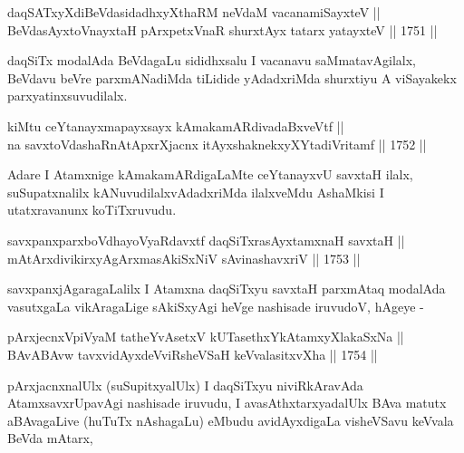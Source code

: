 \begin{shl}
daqSATxyXdiBeVdasidadhxyXthaRM neVdaM vacanamiSayxteV ||  \\
BeVdasAyxtoV\s nayxtaH pArxpetxVnaR shurxtAyx tatarx yatayxteV ||  1751 ||  
\end{shl}

\begin{artha}
daqSiTx modalAda BeVdagaLu sididhxsalu I vacanavu saMmatavAgilalx,
BeVdavu beVre parxmANadiMda tiLidide yAdadxriMda shurxtiyu A
viSayakekx parxyatinxsuvudilalx.
\end{artha}

\begin{shl}
kiMtu ceYtanayxmapayxsayx kAmakamARdivadaBxveVtf || \\
na savxtoV\s dashaRnAtApxrXjacnx itAyxshaknekxyXYtadiVritamf ||  1752 ||  
\end{shl}

\begin{artha}
Adare I Atamxnige kAmakamARdigaLaMte ceYtanayxvU savxtaH ilalx,
suSupatxnalilx kANuvudilalxvAdadxriMda ilalxveMdu AshaMkisi I
utatxravanunx koTiTxruvudu.
\end{artha}


\begin{shl}
savxpanxparxboVdhayoVyaRdavxtf daqSiTxrasAyx\s \s tamxnaH savxtaH || \\
mAtArxdivikirxyAgArxmasAkiSxNiV sA\s vinashavxriV ||  1753 ||  
\end{shl}

\begin{artha}
savxpanxjAgaragaLalilx I Atamxna daqSiTxyu savxtaH parxmAtaq modalAda
vasutxgaLa vikAragaLige sAkiSxyAgi heVge nashisade iruvudoV, hAgeye -
\end{artha}

\begin{shl}
pArxjecnxV\s piVyaM tatheYvA\s \s setxV kUTasethxYkAtamxyXlakaSxNa ||  \\
BAvABAvw tavxvidAyxdeVviRsheVSaH keVvalasitxvXha ||  1754 ||  
\end{shl}

\begin{artha}
pArxjacnxnalUlx (suSupitxyalUlx) I daqSiTxyu niviRkAravAda
AtamxsavxrUpavAgi nashisade iruvudu, I avasAthxtarxyadalUlx BAva
matutx aBAvagaLive (huTuTx nAshagaLu) eMbudu avidAyxdigaLa visheVSavu
keVvala BeVda mAtarx,
\end{artha}

